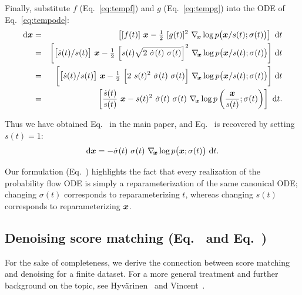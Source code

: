 Finally, substitute $f$ (Eq.~\ref{eq:tempf}) and $g$ (Eq.~\ref{eq:tempg}) into the ODE of Eq.~\ref{eq:tempode}:
\begin{eqnarray}
  \mathrm{d}\boldsymbol{x} &=& \left[ [f(t)] ~\boldsymbol{x} - \tfrac{1}{2} ~[g(t)]^2 ~\nabla_{\hspace{-0.5mm}\boldsymbol{x}} \log p\big( \boldsymbol{x} / s(t); \sigma(t) \big) \right] ~\mathrm{d} t \\
  &=& \bigg[ \big[ \dot s(t) / s(t) \big] ~\boldsymbol{x} - \tfrac{1}{2} ~\Big[ s(t) \sqrt{2 ~\dot\sigma(t) ~\sigma(t)} \Big]^2 ~\nabla_{\hspace{-0.5mm}\boldsymbol{x}} \log p\big( \boldsymbol{x} / s(t); \sigma(t) \big) \bigg] ~\mathrm{d} t \\
  &=& \bigg[ \big[ \dot s(t) / s(t) \big] ~\boldsymbol{x} - \tfrac{1}{2} ~\Big[ 2 ~s(t)^2 ~\dot\sigma(t) ~\sigma(t) \Big] ~\nabla_{\hspace{-0.5mm}\boldsymbol{x}} \log p\big( \boldsymbol{x} / s(t); \sigma(t) \big) \bigg] ~\mathrm{d} t \\
  &=& \left[ \frac{\dot s(t)}{s(t)} ~\boldsymbol{x} -s(t)^2 ~\dot\sigma(t) ~\sigma(t) ~\nabla_{\hspace{-0.5mm}\boldsymbol{x}} \log p\left(\frac{\boldsymbol{x}}{s(t)}; \sigma(t)\right) \right] ~\mathrm{d} t
  \text{.}
\end{eqnarray}

Thus we have obtained Eq.~ in the main paper, and Eq.~ is recovered by setting $s(t) = 1$:
\begin{equation}
  \mathrm{d}\boldsymbol{x} = -\dot\sigma(t) ~\sigma(t) ~\nabla_{\hspace{-0.5mm}\boldsymbol{x}} \log p\big( \boldsymbol{x}; \sigma(t) \big) ~\mathrm{d} t
  \text{.}
\end{equation}

Our formulation (Eq.~) highlights the fact that every realization of the probability flow ODE is simply a reparameterization of the same canonical ODE; changing $\sigma(t)$ corresponds to reparameterizing $t$, whereas changing $s(t)$ corresponds to reparameterizing $\boldsymbol{x}$.

\subsection{Denoising score matching (Eq.~ and Eq.~)}
\label{app:scorematching}

For the sake of completeness, we derive the connection between score matching and denoising for a finite dataset. For a more general treatment and further background on the topic, see Hyv\"arinen~\cite{Hyvarinen05} and Vincent~\cite{Vincent11}.

